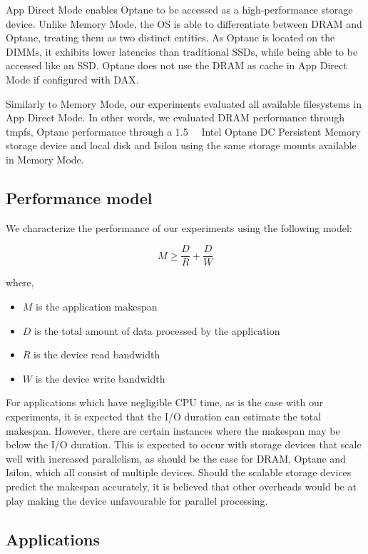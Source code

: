 \documentclass[conference]{IEEEtran}
\begin{document}
App Direct Mode enables Optane to be accessed as a high-performance storage device.
Unlike Memory Mode, the OS is able to differentiate between DRAM and Optane,
treating them as two distinct entities. As Optane is located on
the DIMMs, it exhibits lower latencies than traditional SSDs, while being able
to be accessed like an SSD. Optane does not use the DRAM as cache in App Direct Mode
if configured with DAX.

Similarly to Memory Mode, our experiments evaluated all available filesystems in App Direct
Mode. In other words, we evaluated DRAM performance through tmpfs, Optane performance through
a \SI{1.5}{\tebi\byte} Intel Optane DC Persistent Memory storage device and local disk
and Isilon using the same storage mounts available in Memory Mode.


\subsection{Performance model}

We characterize the performance of our experiments using the following model:

\begin{equation}
    M \geq \frac{D}{R} + \frac{D}{W} \label{eq:makespan}
\end{equation}

where,
\begin{itemize}
        \item $M$ is the application makespan
        \item $D$ is the total amount of data processed by the application
        \item $R$ is the device read bandwidth
        \item $W$ is the device write bandwidth
\end{itemize}

For applications which have negligible CPU time, as is the case with our experiments, 
it is expected that the I/O duration can estimate the total makespan. However, there
are certain instances where the makespan may be below the I/O duration. This is expected
to occur with storage devices that scale well with increased parallelism, as should be the
case for DRAM, Optane and Isilon, which all consist of multiple devices. Should the
scalable storage devices predict the makespan accurately, it is believed that other overheads
would be at play making the device unfavourable for parallel processing.

\subsection{Applications}
\end{document}
